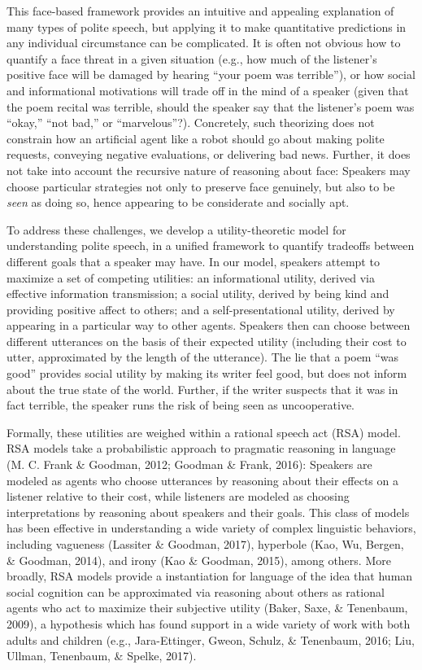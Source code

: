 \documentclass[floatsintext,man]{apa6}
\theoremstyle{definition}
\theoremstyle{definition}
\theoremstyle{definition}
\theoremstyle{remark}
\begin{document}
This face-based framework provides an intuitive and appealing
explanation of many types of polite speech, but applying it to make
quantitative predictions in any individual circumstance can be
complicated. It is often not obvious how to quantify a face threat in a
given situation (e.g., how much of the listener's positive face will be
damaged by hearing \enquote{your poem was terrible}), or how social and
informational motivations will trade off in the mind of a speaker (given
that the poem recital was terrible, should the speaker say that the
listener's poem was \enquote{okay,} \enquote{not bad,} or
\enquote{marvelous}?). Concretely, such theorizing does not constrain
how an artificial agent like a robot should go about making polite
requests, conveying negative evaluations, or delivering bad news.
Further, it does not take into account the recursive nature of reasoning
about face: Speakers may choose particular strategies not only to
preserve face genuinely, but also to be \emph{seen} as doing so, hence
appearing to be considerate and socially apt.

To address these challenges, we develop a utility-theoretic model for
understanding polite speech, in a unified framework to quantify
tradeoffs between different goals that a speaker may have. In our model,
speakers attempt to maximize a set of competing utilities: an
informational utility, derived via effective information transmission; a
social utility, derived by being kind and providing positive affect to
others; and a self-presentational utility, derived by appearing in a
particular way to other agents. Speakers then can choose between
different utterances on the basis of their expected utility (including
their cost to utter, approximated by the length of the utterance). The
lie that a poem \enquote{was good} provides social utility by making its
writer feel good, but does not inform about the true state of the world.
Further, if the writer suspects that it was in fact terrible, the
speaker runs the risk of being seen as uncooperative.

Formally, these utilities are weighed within a rational speech act (RSA)
model. RSA models take a probabilistic approach to pragmatic reasoning
in language (M. C. Frank \& Goodman, 2012; Goodman \& Frank, 2016):
Speakers are modeled as agents who choose utterances by reasoning about
their effects on a listener relative to their cost, while listeners are
modeled as choosing interpretations by reasoning about speakers and
their goals. This class of models has been effective in understanding a
wide variety of complex linguistic behaviors, including vagueness
(Lassiter \& Goodman, 2017), hyperbole (Kao, Wu, Bergen, \& Goodman,
2014), and irony (Kao \& Goodman, 2015), among others. More broadly, RSA
models provide a instantiation for language of the idea that human
social cognition can be approximated via reasoning about others as
rational agents who act to maximize their subjective utility (Baker,
Saxe, \& Tenenbaum, 2009), a hypothesis which has found support in a
wide variety of work with both adults and children (e.g., Jara-Ettinger,
Gweon, Schulz, \& Tenenbaum, 2016; Liu, Ullman, Tenenbaum, \& Spelke,
2017).
\end{document}
